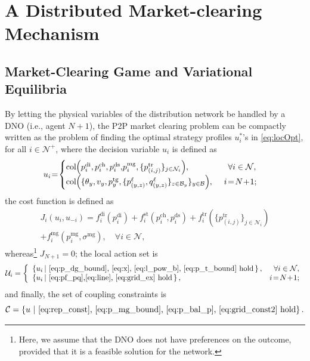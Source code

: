 \documentclass{IEEEtran}  %
\newtheorem{definition}{Definition}
\newcommand{\mc}{\mathcal}
\newcommand{\col}{\operatorname{col}}
\newcommand{\0}{\mathbf{0}}
\newcommand{\1}{\mathbf{1}}
\begin{document}
\section{A Distributed Market-clearing Mechanism}
\label{sub:alg}
\subsection{Market-Clearing Game and Variational Equilibria}
By letting the physical variables of the distribution network be handled by a DNO (i.e., agent $N\!+\!1$), the P2P market clearing problem can be compactly written as the problem of finding the optimal strategy profiles $u_i^*$'s in \eqref{eq:locOpt}, for all $i \in \mc N^+$, where the decision variable $u_i$ is defined as
$$u_i \hspace{-2pt} = \hspace{-2pt}\begin{cases} \col\hspace{-2pt}\left(p_{i}^{\mathrm{di}},{p_{i}^{\mathrm{ch}},p_{i}^{\mathrm{ds}}, } p_{i}^{\mathrm{mg}},\{p_{(i,j)}^{\mathrm {tr}}\}_{j\in \mc N_i}\right)\hspace{-2pt}, \ \qquad \qquad \;  \forall  i \in \mc N,\\
	\col\hspace{-2pt}\left(\{\theta_y, v_y, p_y^{\mathrm{tg}},\{p_{(y,z)}^{\ell},q_{(y,z)}^{\ell}\}_{z \in \mc B_y} \}_{y\in\mc B} \right)\hspace{-2pt},  \; \quad i\!=\! N\!+\!1;
		\end{cases}$$ 
the cost function is defined as
	\begin{multline}
	J_i(u_i,u_{-i}) =
f_{i}^{\mathrm{di}}(p_{i}^{\mathrm{di}}) + f_{i}^{\mathrm{st}}({p_{i}^{\mathrm{ch}},p_{i}^{\mathrm{ds}}})+ f_{i}^{\mathrm{tr}} \left( \{ p_{(i,j)}^{\mathrm{tr}} \}_{j \in \mc N_i} \right)\\
    + f_{i}^{\mathrm{mg}}\left( p_{i}^{\mathrm{mg}},\sigma^{\textrm{mg}} \right), \quad \forall  i \in \mc N,
 \label{eq:cost_def}
	\end{multline}
whereas\footnote{Here, we assume that the DNO does not have preferences on the outcome, provided that it is a feasible solution for the network.} $J_{N+1}=0$; the local action set is
\begin{align}
\label{eq:constr_def}
\mc U_i =
\left\{
\begin{array}{l r}
\left\{u_i \,|~ \text{\eqref{eq:p_dg_bound}, \eqref{eq:x}, \eqref{eq:l_pow_b}, \eqref{eq:p_t_bound} hold} \, \right\}, & \forall i \in \mc N, \\
\left\{ u_i \,|~ \text{\eqref{eq:pf_pq},\eqref{eq:line}, \eqref{eq:grid_ex} hold} \,\right\}, & i\!=\!N\!+\!1;
\end{array}
\right.
\end{align}
and finally, the set of coupling constraints is 
\begin{equation}
\label{eq:Cconstr_def}
\mc C = \left\{
u~|~ \text{\eqref{eq:rep_const}, \eqref{eq:p_mg_bound}, \eqref{eq:p_bal_p}, \eqref{eq:grid_const2} hold}
\right\}.
\end{equation}
\end{document}
